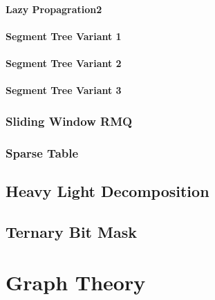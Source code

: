 \documentclass[1pt]{report}
\begin{document}
\subsubsection{Lazy Propagration2}

\subsubsection{Segment Tree Variant 1}

\subsubsection{Segment Tree Variant 2}

\subsubsection{Segment Tree Variant 3}

\subsection{Sliding Window RMQ}

\subsection{Sparse Table}


\section{Heavy Light Decomposition}


\section{Ternary Bit Mask}





\chapter{Graph Theory}
\end{document}
